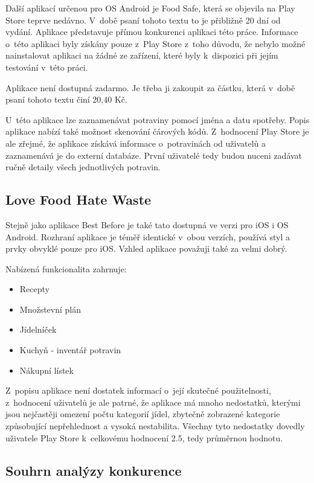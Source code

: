 \documentclass[thesis=B,czech]{FITthesis}[2013/10/20]
\begin{document}
Další aplikací určenou pro OS Android je Food Safe, která se objevila na Play Store teprve nedávno. V~době psaní tohoto textu to je přibližně 20 dní od vydání. Aplikace představuje přímou konkurenci aplikaci této práce. Informace o~této aplikaci byly získány pouze z~Play Store z~toho důvodu, že nebylo možné nainstalovat aplikaci na žádné ze zařízení, které byly k~dispozici při jejím testování v~této práci. 

Aplikace není dostupná zadarmo. Je třeba ji zakoupit za částku, která v~době psaní tohoto textu činí 20,40 Kč.

U~této aplikace lze zaznamenávat potraviny pomocí jména a datu spotřeby. Popis aplikace nabízí také možnost skenování čárových kódů. Z~hodnocení Play Store je ale zřejmé, že aplikace získává informace o~potravinách od uživatelů a zaznamenává je do externí databáze. První uživatelé tedy budou nuceni zadávat ručně detaily všech jednotlivých potravin.

\subsection{Love Food Hate Waste}

Stejně jako aplikace Best Before je také tato dostupná ve verzi pro iOS i OS Android. Rozhraní aplikace je téměř identické v~obou verzích, používá styl a prvky obvyklé pouze pro iOS. Vzhled aplikace považuji také za velmi dobrý.

Nabízená funkcionalita zahrnuje:
\begin{itemize}
  \item{Recepty}
  \item{Množstevní plán}
  \item{Jídelníček}
  \item{Kuchyň - inventář potravin}
  \item{Nákupní lístek}
\end{itemize}

Z~popisu aplikace není dostatek informací o~její skutečné použitelnosti, z~hodnocení uživatelů je ale patrné, že aplikace má mnoho nedostatků, kterými jsou nejčastěji omezení počtu kategorií jídel, zbytečně zobrazené kategorie způsobující nepřehlednost a vysoká nestabilita. Všechny tyto nedostatky dovedly uživatele Play Store k~celkovému hodnocení 2.5, tedy průměrnou hodnotu.

\subsection{Souhrn analýzy konkurence}
\end{document}
